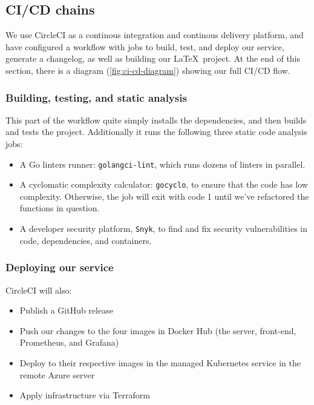 \subsection{CI/CD chains}

We use CircleCI as a continous integration and continous delivery platform, and have configured a workflow \cite{workflow:circleci} with jobs to build, test, and deploy our service, generate a changelog, as well as building our \LaTeX\ project. At the end of this section, there is a diagram (\autoref{fig:ci-cd-diagram}) showing our full CI/CD flow.

\subsubsection{Building, testing, and static analysis}

This part of the workflow quite simply installs the dependencies, and then builds and tests the project. Additionally it runs the following three static code analysis jobs:
\begin{itemize}
    \item A Go linters runner: \texttt{golangci-lint}, which runs dozens of linters in parallel.
    \item A cyclomatic complexity calculator: \texttt{gocyclo}, to ensure that the code has low complexity. Otherwise, the job will exit with code 1 until we've refactored the functions in question.
    \item A developer security platform, \texttt{Snyk}, to find and fix security vulnerabilities in code, dependencies, and containers.
\end{itemize}


\subsubsection{Deploying our service}

CircleCI will also:
\begin{itemize}
    \item Publish a GitHub release
    \item Push our changes to the four images in Docker Hub (the server, front-end, Prometheus, and Grafana)
    \item Deploy to their respective images in the managed Kubernetes service in the remote Azure server
    \item Apply infrastructure via Terraform
\end{itemize}


